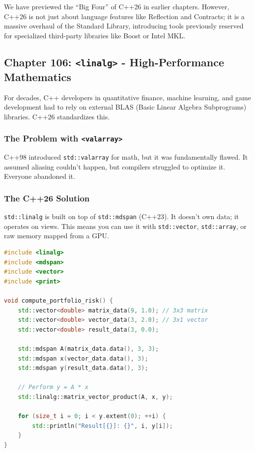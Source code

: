 We have previewed the ``Big Four'' of C++26 in earlier chapters.
However, C++26 is not just about language features like Reflection and
Contracts; it is a massive overhaul of the Standard Library, introducing
tools previously reserved for specialized third-party libraries like
Boost or Intel MKL.

\hypertarget{chapter-106-linalg---high-performance-mathematics}{%
\subsection{\texorpdfstring{Chapter 106:
\texttt{\textless{}linalg\textgreater{}} - High-Performance
Mathematics}{Chapter 106: \textless linalg\textgreater{} - High-Performance Mathematics}}\label{chapter-106-linalg---high-performance-mathematics}}

For decades, C++ developers in quantitative finance, machine learning,
and game development had to rely on external BLAS (Basic Linear Algebra
Subprograms) libraries. C++26 standardizes this.

\hypertarget{the-problem-with-valarray}{%
\subsubsection{\texorpdfstring{The Problem with
\texttt{\textless{}valarray\textgreater{}}}{The Problem with \textless valarray\textgreater{}}}\label{the-problem-with-valarray}}

C++98 introduced \passthrough{\lstinline!std::valarray!} for math, but
it was fundamentally flawed. It assumed aliasing couldn't happen, but
compilers struggled to optimize it. Everyone abandoned it.

\hypertarget{the-c26-solution}{%
\subsubsection{The C++26 Solution}\label{the-c26-solution}}

\passthrough{\lstinline!std::linalg!} is built on top of
\passthrough{\lstinline!std::mdspan!} (C++23). It doesn't own data; it
operates on views. This means you can use it with
\passthrough{\lstinline!std::vector!},
\passthrough{\lstinline!std::array!}, or raw memory mapped from a GPU.

\begin{lstlisting}[language={C++}]
#include <linalg>
#include <mdspan>
#include <vector>
#include <print>

void compute_portfolio_risk() {
    std::vector<double> matrix_data(9, 1.0); // 3x3 matrix
    std::vector<double> vector_data(3, 2.0); // 3x1 vector
    std::vector<double> result_data(3, 0.0);

    std::mdspan A(matrix_data.data(), 3, 3);
    std::mdspan x(vector_data.data(), 3);
    std::mdspan y(result_data.data(), 3);

    // Perform y = A * x
    std::linalg::matrix_vector_product(A, x, y);

    for (size_t i = 0; i < y.extent(0); ++i) {
        std::println("Result[{}]: {}", i, y[i]);
    }
}
\end{lstlisting}

